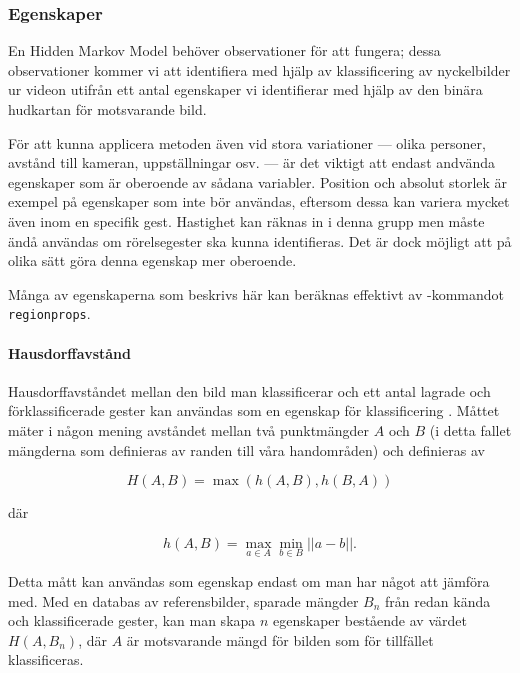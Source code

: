 \documentclass[../rapport_MVEX01-11-05]{subfiles}
\begin{document}
\subsubsection{Egenskaper}
En Hidden Markov Model behöver observationer för att fungera; dessa
observationer kommer vi att identifiera med hjälp av klassificering av
nyckelbilder ur videon utifrån ett antal egenskaper vi identifierar
med hjälp av den binära hudkartan för motsvarande bild.

För att kunna applicera metoden även vid stora variationer --- olika
personer, avstånd till kameran, uppställningar osv. --- är det viktigt
att endast andvända egenskaper som är oberoende av sådana variabler.
Position och absolut storlek är exempel på egenskaper som inte bör
användas, eftersom dessa kan variera mycket även inom en specifik
gest. Hastighet kan räknas in i denna grupp men måste ändå användas
om rörelsegester ska kunna identifieras. Det är dock möjligt att på
olika sätt göra denna egenskap mer oberoende.

Många av egenskaperna som beskrivs här kan beräknas effektivt av
\MATLAB-kommandot \texttt{regionprops}.


\paragraph{Hausdorffavstånd}

Hausdorffavståndet mellan den bild man klassificerar och ett antal
lagrade och förklassificerade gester kan användas som en egenskap för
klassificering \cite{Nielsen04}. Måttet mäter i någon mening avståndet
mellan två punktmängder $A$ och $B$ (i detta fallet mängderna som definieras av
randen till våra handområden) och definieras av

\begin{equation*}
  H(A, B) = \max\left(h(A,B),h(B, A)\right)
\end{equation*}

där

\begin{equation*}
  h(A, B) = \max\limits_{a\in A}\min\limits_{b\in
  B}\left|\left|a-b\right|\right|.
\end{equation*}

Detta mått kan användas som egenskap endast om man har något att
jämföra med. Med en databas av referensbilder, sparade mängder $B_n$ från redan kända
och klassificerade gester, kan man skapa $n$ egenskaper bestående av
värdet $H(A,B_n)$, där $A$ är motsvarande mängd för bilden som för
tillfället klassificeras.
\end{document}
